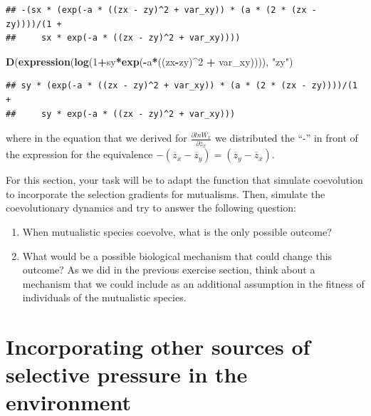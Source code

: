 \documentclass[
]{book}
\newenvironment{Shaded}{\begin{snugshade}}{\end{snugshade}}
\newcommand{\DecValTok}[1]{\textcolor[rgb]{0.00,0.00,0.81}{#1}}
\newcommand{\FunctionTok}[1]{\textcolor[rgb]{0.13,0.29,0.53}{\textbf{#1}}}
\newcommand{\NormalTok}[1]{#1}
\newcommand{\SpecialCharTok}[1]{\textcolor[rgb]{0.81,0.36,0.00}{\textbf{#1}}}
\newcommand{\StringTok}[1]{\textcolor[rgb]{0.31,0.60,0.02}{#1}}
\begin{document}
\begin{verbatim}
## -(sx * (exp(-a * ((zx - zy)^2 + var_xy)) * (a * (2 * (zx - zy))))/(1 + 
##     sx * exp(-a * ((zx - zy)^2 + var_xy))))
\end{verbatim}

\begin{Shaded}
\begin{Highlighting}[]
\FunctionTok{D}\NormalTok{(}\FunctionTok{expression}\NormalTok{(}\FunctionTok{log}\NormalTok{(}\DecValTok{1}\SpecialCharTok{+}\NormalTok{sy}\SpecialCharTok{*}\FunctionTok{exp}\NormalTok{(}\SpecialCharTok{{-}}\NormalTok{a}\SpecialCharTok{*}\NormalTok{((zx}\SpecialCharTok{{-}}\NormalTok{zy)}\SpecialCharTok{\^{}}\DecValTok{2} \SpecialCharTok{+}\NormalTok{ var\_xy)))), }\StringTok{"zy"}\NormalTok{)}
\end{Highlighting}
\end{Shaded}

\begin{verbatim}
## sy * (exp(-a * ((zx - zy)^2 + var_xy)) * (a * (2 * (zx - zy))))/(1 + 
##     sy * exp(-a * ((zx - zy)^2 + var_xy)))
\end{verbatim}

where in the equation that we derived for \(\frac{\partial ln\overline{W_x}}{\partial \overline{z}_x}\) we distributed the ``-'' in front of the expression for the equivalence \(-(\overline{z}_x-\overline{z}_y)=(\overline{z}_y-\overline{z}_x)\).

For this section, your task will be to adapt the function that simulate coevolution to incorporate the selection gradients for mutualisms. Then, simulate the coevolutionary dynamics and try to answer the following question:

\begin{enumerate}
\def\labelenumi{\arabic{enumi}.}
\item
  When mutualistic species coevolve, what is the only possible outcome?
\item
  What would be a possible biological mechanism that could change this outcome? As we did in the previous exercise section, think about a mechanism that we could include as an additional assumption in the fitness of individuals of the mutualistic species.
\end{enumerate}

\hypertarget{incorporating-other-sources-of-selective-pressure-in-the-environment}{%
\section{Incorporating other sources of selective pressure in the environment}\label{incorporating-other-sources-of-selective-pressure-in-the-environment}}
\end{document}
